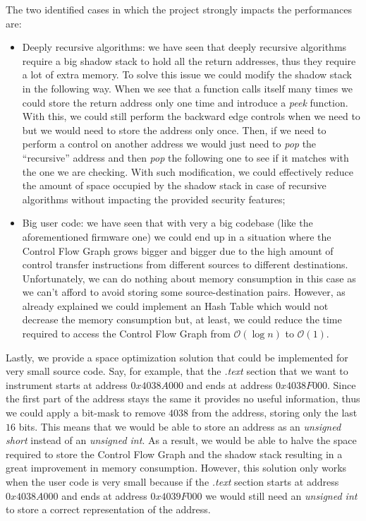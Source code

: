 The two identified cases in which the project strongly impacts the performances
are:
\begin{itemize}
  \item Deeply recursive algorithms: we have seen that deeply recursive
    algorithms require a big shadow stack to hold all the return addresses, thus
    they require a lot of extra memory. To solve this issue we could modify the
    shadow stack in the following way. When we see that a function calls itself many
    times we could store the return address only one time and introduce a \textit{peek}
    function. With this, we could still perform the backward edge controls when
    we need to but we would need to store the address only once. Then, if we
    need to perform a control on another address we would just need to \textit{pop}
    the ``recursive'' address and then \textit{pop} the following one to see if
    it matches with the one we are checking. With such modification, we could
    effectively reduce the amount of space occupied by the shadow stack in case
    of recursive algorithms without impacting the provided security features;

  \item Big user code: we have seen that with very a big codebase (like the aforementioned
    firmware one) we could end up in a situation where the Control Flow Graph
    grows bigger and bigger due to the high amount of control transfer
    instructions from different sources to different destinations. Unfortunately,
    we can do nothing about memory consumption in this case as we can't afford
    to avoid storing some source-destination pairs. However, as already
    explained we could implement an Hash Table which would not decrease the
    memory consumption but, at least, we could reduce the time required to
    access the Control Flow Graph from $\mathcal{O}(\log{n})$ to
    $\mathcal{O}(1)$.
\end{itemize}

Lastly, we provide a space optimization solution that could be implemented for very
small source code. Say, for example, that the \textit{.text} section that we want
to instrument starts at address $0x4038A0 00$ and ends at address $0x4038F000$.
Since the first part of the address stays the same it provides no useful
information, thus we could apply a bit-mask to remove $4038$ from the address,
storing only the last $16$ bits. This means that we would be able to store an address
as an \textit{unsigned short} instead of an \textit{unsigned int}. As a result, we
would be able to halve the space required to store the Control Flow Graph and the
shadow stack resulting in a great improvement in memory consumption. However, this
solution only works when the user code is very small because if the \textit{.text}
section starts at address $0x4038A000$ and ends at address $0x4039F000$ we would
still need an \textit{unsigned int} to store a correct representation of the address.

